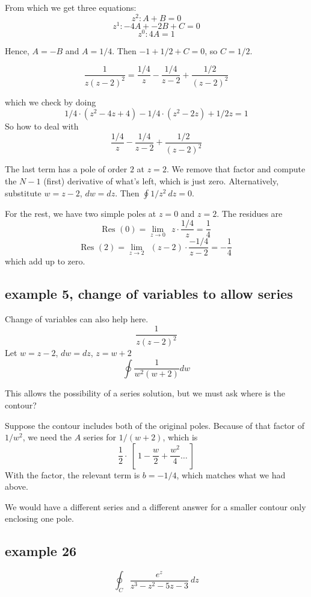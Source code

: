 \documentclass[11pt, oneside]{article}
\begin{document}
From which we get three equations:
\[ z^2:  A + B = 0 \]
\[ z^1: -4A + -2B + C = 0 \]
\[ z^0:  4A = 1 \]

Hence, $A = -B$ and $A = 1/4$. Then $-1 + 1/2 + C = 0$, so $C = 1/2$.

\[ \frac{1}{z(z-2)^2} = \frac{1/4}{z} - \frac{1/4}{z-2} +  \frac{1/2}{(z-2)^2}  \]

which we check by doing
\[ 1/4 \cdot (z^2 - 4z + 4) - 1/4 \cdot (z^2 - 2z) + 1/2 z = 1 \]
So how to deal with 
\[ \frac{1/4}{z} - \frac{1/4}{z-2} +  \frac{1/2}{(z-2)^2}  \]

The last term has a pole of order $2$ at $z = 2$.  We remove that factor and compute the $N-1$ (first) derivative of what's left, which is just zero.  Alternatively, substitute $w = z - 2$, $dw = dz$.  Then $\oint 1/z^2 \ dz = 0$.

For the rest, we have two simple poles at $z=0$ and $z=2$.  The residues are
\[ \text{Res } (0) = \lim_{z \rightarrow 0} \ \ z \cdot \frac{1/4}{z} = \frac{1}{4} \]
\[ \text{Res } (2) = \lim_{z \rightarrow 2} \ \ (z-2) \cdot \frac{-1/4}{z-2} = - \frac{1}{4} \]
which add up to zero.

\subsection*{example 5, change of variables to allow series}

Change of variables can also help here.
\[ \frac{1}{z(z-2)^2} \]
Let $w = z - 2$, $dw = dz$, $z = w + 2$
\[ \oint \frac{1}{w^2(w+2)} dw \]

This allows the possibility of a series solution, but we must ask where is the contour?

Suppose the contour includes both of the original poles.  Because of that factor of $1/w^2$, we need the $A$ series for $1/(w+2)$, which is
\[ \frac{1}{2} \cdot \ [ \ 1 - \frac{w}{2} + \frac{w^2}{4} \dots \ ]    \]
With the factor, the relevant term is $b = -1/4$, which matches what we had above.

We would have a different series and a different answer for a smaller contour only enclosing one pole.

\subsection*{example 26}

\label{sec:ex26R}

\[ \oint_C \frac{e^z}{z^3 - z^2 - 5z - 3} \ dz \]
\end{document}
